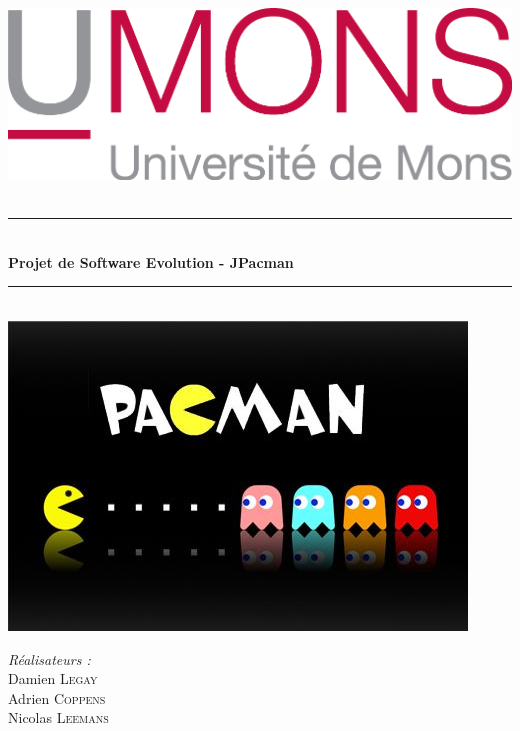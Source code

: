 \documentclass[12pt, openany]{report}
\newcommand{\HRule}{\rule{\linewidth}{0.5mm}}
\begin{document}
\begin{titlepage}
  \begin{sffamily}
  \begin{center}

    \includegraphics[scale=0.2]{Images/UMONS+txt.png}   ~\\[1.5cm]
    


    \HRule \\[0.4cm]
    { \huge \bfseries Projet de Software Evolution - JPacman\\[0.4cm] }
    \HRule \\[2cm]
    \includegraphics[scale=0.5]{Images/Pac-Man.jpg}~\\[1.5cm] 

    
    

    \begin{minipage}{0.4\textwidth}
      \begin{flushleft} \large
        \emph{Réalisateurs :\\} Damien \textsc{Legay}\\ Adrien \textsc{Coppens}\\ Nicolas \textsc{Leemans}\\
        

\end{flushleft}
\end{minipage}
\end{center}
\end{sffamily}
\end{titlepage}
\end{document}
